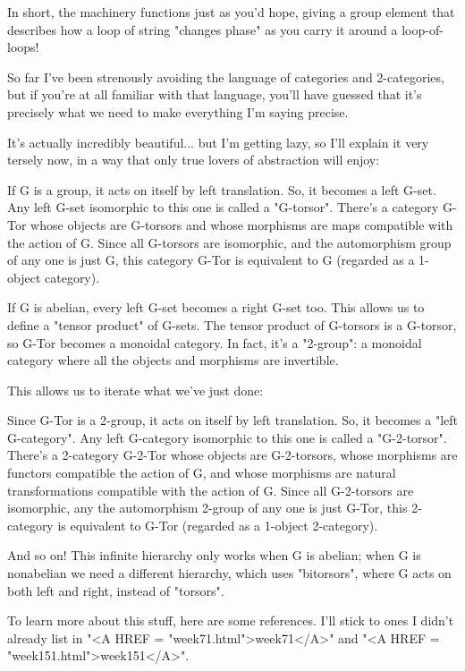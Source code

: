 In short, the machinery functions just as you'd hope, giving a group
element that describes how a loop of string "changes phase"
as you carry it around a loop-of-loops!

So far I've been strenously avoiding the language of categories and 
2-categories, but if you're at all familiar with that language, you'll
have guessed that it's precisely what we need to make everything I'm 
saying precise.

It's actually incredibly beautiful... but I'm getting lazy, so I'll 
explain it very tersely now, in a way that only true lovers of abstraction 
will enjoy:

If G is a group, it acts on itself by left translation.  So, it
becomes a left G-set.  Any left G-set isomorphic to this one is called
a "G-torsor".  There's a category G-Tor whose objects are
G-torsors and whose morphisms are maps compatible with the action of
G.  Since all G-torsors are isomorphic, and the automorphism group of
any one is just G, this category G-Tor is equivalent to G (regarded as
a 1-object category).

If G is abelian, every left G-set becomes a right G-set too.  This
allows us to define a "tensor product" of G-sets.  The
tensor product of G-torsors is a G-torsor, so G-Tor becomes a monoidal
category.  In fact, it's a "2-group": a monoidal category
where all the objects and morphisms are invertible.

This allows us to iterate what we've just done:

Since G-Tor is a 2-group, it acts on itself by left translation.  So,
it becomes a "left G-category".  Any left G-category
isomorphic to this one is called a "G-2-torsor".  There's a
2-category G-2-Tor whose objects are G-2-torsors, whose morphisms are
functors compatible the action of G, and whose morphisms are natural
transformations compatible with the action of G.  Since all
G-2-torsors are isomorphic, any the automorphism 2-group of any one is
just G-Tor, this 2-category is equivalent to G-Tor (regarded as a
1-object 2-category).

And so on!  This infinite hierarchy only works when G is abelian;
when G is nonabelian we need a different hierarchy, which uses 
"bitorsors", where G acts on both left and right, instead 
of "torsors".  

To learn more about this stuff, here are some references.  I'll stick
to ones I didn't already list in "<A HREF =
"week71.html">week71</A>" and "<A HREF =
"week151.html">week151</A>".


